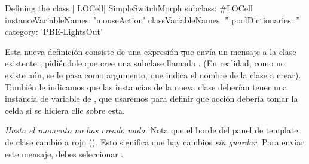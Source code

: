 \documentclass[a4paper,10pt,twoside]{book}
\begin{document}
\begin{classdef}[firstClassDef]{Defining the class \ct| LOCell|}
SimpleSwitchMorph subclass: #LOCell
   instanceVariableNames: 'mouseAction'
   classVariableNames: ''
   poolDictionaries: ''
   category: 'PBE-LightsOut'
\end{classdef}


Esta nueva definici\'on consiste de una expresi\'on \st que env\'ia un mensaje a la
clase existente , pidi\'endole que cree una subclase llamada
. (En realidad, como  no existe a\'un, se le pasa 
  como argumento, que indica el nombre de la clase a 
crear). Tambi\'en le indicamos que las instancias de la nueva clase deber\'ian 
tener una instancia de variable de , que usaremos para definir
que acci\'on deber\'ia tomar la celda si se hiciera clic sobre esta.



\emph {Hasta el momento no has creado nada.}
Nota que el borde del panel de template de clase cambi\'o a rojo ().
Esto significa que hay cambios \emph {sin guardar.}
Para enviar este mensaje, debes seleccionar . 



\end{document}
